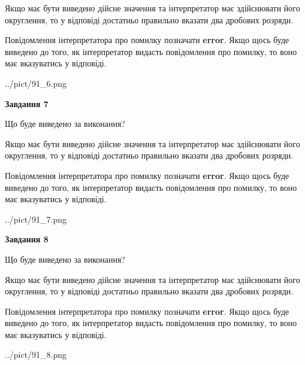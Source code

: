 \documentclass[12pt, ukrainian]{article}
\begin{document}
{\begin {Large}
Якщо має бути виведено дійсне значення та інтерпретатор має здійснювати його округлення, 
то у відповіді достатньо правильно вказати два дробових розряди.

Повідомлення інтерпретатора про помилку позначати \textbf{error}.
Якщо щось буде виведено до того, як інтерпретатор видасть повідомлення про помилку, 
то воно має вказуватись у відповіді. \par

\begin{center}
	{../pict/91_6.png}
\end{center}
\newpage

{\begin {center}\textbf{Завдання 7}\end {center}}\par
Що буде виведено за виконання? \par

Якщо має бути виведено дійсне значення та інтерпретатор має здійснювати його округлення, 
то у відповіді достатньо правильно вказати два дробових розряди.

Повідомлення інтерпретатора про помилку позначати \textbf{error}.
Якщо щось буде виведено до того, як інтерпретатор видасть повідомлення про помилку, 
то воно має вказуватись у відповіді. \par

\begin{center}
	{../pict/91_7.png}
\end{center}
\newpage

{\begin {center}\textbf{Завдання 8}\end {center}}\par
Що буде виведено за виконання? \par

Якщо має бути виведено дійсне значення та інтерпретатор має здійснювати його округлення, 
то у відповіді достатньо правильно вказати два дробових розряди.

Повідомлення інтерпретатора про помилку позначати \textbf{error}.
Якщо щось буде виведено до того, як інтерпретатор видасть повідомлення про помилку, 
то воно має вказуватись у відповіді. \par

\begin{center}
	{../pict/91_8.png}
\end{center}
\newpage


\end{Large}}
\end{document}
